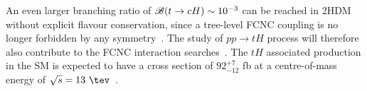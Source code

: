An even larger branching ratio of  $\mathscr{B}(t\to cH) \sim 10^{-3}$ can be reached in 2HDM without explicit flavour conservation, since a tree-level FCNC coupling is no longer forbidden by any symmetry~\cite{Cheng:1987rs,Baum:2008qm,Chen:2013qta,Chiang:2015cba,Crivellin:2015hha,Botella:2015hoa, Gori:2017tvg,Chiang:2017fjr}. 
The study of $pp\rightarrow tH$ process will therefore also contribute to the FCNC interaction searches~\cite{Greljo:2014dka}.
The $tH$ associated production in the SM is expected to have a cross section of $92^{+7}_{-12}$ fb at a centre-of-mass energy of $\sqrt{s}= 13~\tev$~\cite{deFlorian:2016spz}.

